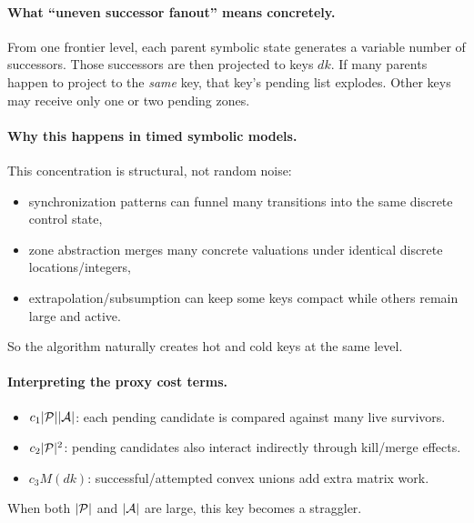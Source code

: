 \paragraph{What ``uneven successor fanout'' means concretely.}
From one frontier level, each parent symbolic state generates a variable number of successors.
Those successors are then projected to keys $dk$.
If many parents happen to project to the \emph{same} key, that key's pending list explodes.
Other keys may receive only one or two pending zones.

\paragraph{Why this happens in timed symbolic models.}
This concentration is structural, not random noise:
\begin{itemize}
  \item synchronization patterns can funnel many transitions into the same discrete control state,
  \item zone abstraction merges many concrete valuations under identical discrete locations/integers,
  \item extrapolation/subsumption can keep some keys compact while others remain large and active.
\end{itemize}
So the algorithm naturally creates hot and cold keys at the same level.

\paragraph{Interpreting the proxy cost terms.}
\begin{itemize}
  \item $c_1|\mathcal{P}||\mathcal{A}|$: each pending candidate is compared against many live survivors.
  \item $c_2|\mathcal{P}|^2$: pending candidates also interact indirectly through kill/merge effects.
  \item $c_3M(dk)$: successful/attempted convex unions add extra matrix work.
\end{itemize}
When both $|\mathcal{P}|$ and $|\mathcal{A}|$ are large, this key becomes a straggler.

